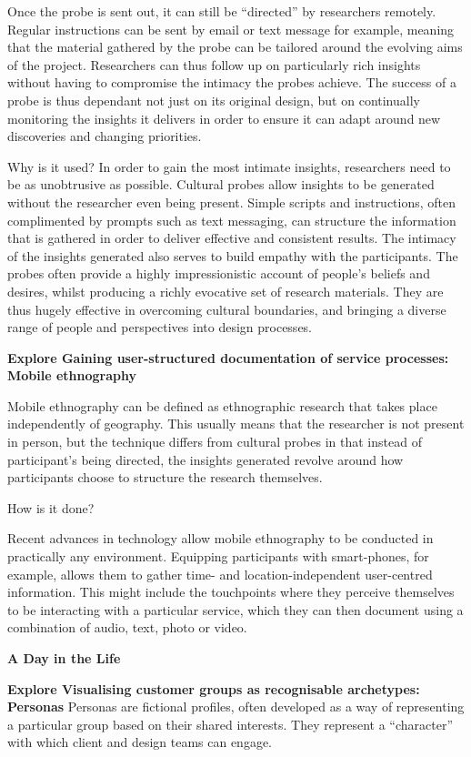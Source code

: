 Once the probe is sent out, it can still be “directed” by researchers remotely. Regular instructions can be sent by email or text message for example, meaning that the material gathered by the probe can be tailored around the evolving aims of the project. Researchers can thus follow up on particularly rich insights without having to compromise the intimacy the probes achieve. The success of a probe is thus dependant not just on its original design, but on continually monitoring the insights it delivers in order to ensure it can adapt around new discoveries and changing priorities.

Why is it used?
In order to gain the most intimate insights, researchers need to be as unobtrusive as possible. Cultural probes allow insights to be generated without the researcher even being present. Simple scripts and instructions, often complimented by prompts such as text messaging, can structure the information that is gathered in order to deliver effective and consistent results. The intimacy of the insights generated also serves to build empathy with the participants. The probes often provide a highly impressionistic account of people’s beliefs and desires, whilst producing a richly evocative set of research materials. They are thus hugely effective in overcoming cultural boundaries, and bringing a diverse range of people and perspectives into design processes.

\textbf{Explore Gaining user-structured documentation of service processes: Mobile ethnography}

Mobile ethnography can be defined as ethnographic research that takes place independently of geography. This usually means that the researcher is not present in person, but the technique differs from cultural probes in that instead of participant’s being directed, the insights generated revolve around how participants choose to structure the research themselves.

How is it done?

Recent advances in technology allow mobile ethnography to be conducted in practically any environment. Equipping participants with smart-phones, for example, allows them to gather time- and location-independent user-centred information. This might include the touchpoints where they perceive themselves to be interacting with a particular service, which they can then document using a combination of audio, text, photo or video.

\textbf{A Day in the Life}

\textbf{Explore Visualising customer groups as recognisable archetypes: Personas}
Personas are fictional profiles, often developed as a way of representing a particular group based on their shared interests. They represent a “character” with which client and design teams can engage.

